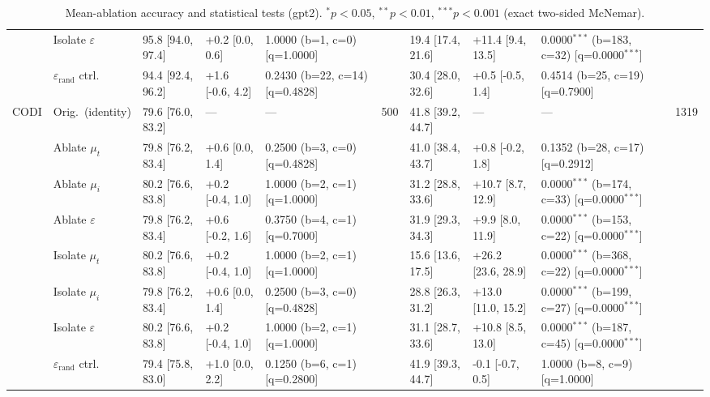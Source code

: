 \begin{table}[h!]
\begin{tabular}{ll lllc lllc}
 & Isolate $\varepsilon$ & 95.8 [94.0, 97.4] & +0.2 [0.0, 0.6] & 1.0000 (b=1, c=0) [q=1.0000] &  & 19.4 [17.4, 21.6] & +11.4 [9.4, 13.5] & 0.0000$^{***}$ (b=183, c=32) [q=0.0000$^{***}$] &  \\
 & $\varepsilon_\mathrm{rand}$ ctrl. & 94.4 [92.4, 96.2] & +1.6 [-0.6, 4.2] & 0.2430 (b=22, c=14) [q=0.4828] &  & 30.4 [28.0, 32.6] & +0.5 [-0.5, 1.4] & 0.4514 (b=25, c=19) [q=0.7900] &  \\
\cmidrule(lr){2-10}
\multirow{8}{*}{CODI} & Orig.\ (identity) & 79.6 [76.0, 83.2] & --- & --- & 500 & 41.8 [39.2, 44.7] & --- & --- & 1319 \\
 & Ablate $\mu_t$ & 79.8 [76.2, 83.4] & +0.6 [0.0, 1.4] & 0.2500 (b=3, c=0) [q=0.4828] &  & 41.0 [38.4, 43.7] & +0.8 [-0.2, 1.8] & 0.1352 (b=28, c=17) [q=0.2912] &  \\
 & Ablate $\mu_i$ & 80.2 [76.6, 83.8] & +0.2 [-0.4, 1.0] & 1.0000 (b=2, c=1) [q=1.0000] &  & 31.2 [28.8, 33.6] & +10.7 [8.7, 12.9] & 0.0000$^{***}$ (b=174, c=33) [q=0.0000$^{***}$] &  \\
 & Ablate $\varepsilon$ & 79.8 [76.2, 83.4] & +0.6 [-0.2, 1.6] & 0.3750 (b=4, c=1) [q=0.7000] &  & 31.9 [29.3, 34.3] & +9.9 [8.0, 11.9] & 0.0000$^{***}$ (b=153, c=22) [q=0.0000$^{***}$] &  \\
 & Isolate $\mu_t$ & 80.2 [76.6, 83.8] & +0.2 [-0.4, 1.0] & 1.0000 (b=2, c=1) [q=1.0000] &  & 15.6 [13.6, 17.5] & +26.2 [23.6, 28.9] & 0.0000$^{***}$ (b=368, c=22) [q=0.0000$^{***}$] &  \\
 & Isolate $\mu_i$ & 79.8 [76.2, 83.4] & +0.6 [0.0, 1.4] & 0.2500 (b=3, c=0) [q=0.4828] &  & 28.8 [26.3, 31.2] & +13.0 [11.0, 15.2] & 0.0000$^{***}$ (b=199, c=27) [q=0.0000$^{***}$] &  \\
 & Isolate $\varepsilon$ & 80.2 [76.6, 83.8] & +0.2 [-0.4, 1.0] & 1.0000 (b=2, c=1) [q=1.0000] &  & 31.1 [28.7, 33.6] & +10.8 [8.5, 13.0] & 0.0000$^{***}$ (b=187, c=45) [q=0.0000$^{***}$] &  \\
 & $\varepsilon_\mathrm{rand}$ ctrl. & 79.4 [75.8, 83.0] & +1.0 [0.0, 2.2] & 0.1250 (b=6, c=1) [q=0.2800] &  & 41.9 [39.3, 44.7] & -0.1 [-0.7, 0.5] & 1.0000 (b=8, c=9) [q=1.0000] &  \\
\bottomrule
\end{tabular}
\caption{Mean-ablation accuracy and statistical tests (gpt2). $^{*}p{<}0.05$, $^{**}p{<}0.01$, $^{***}p{<}0.001$ (exact two-sided McNemar).}
\label{tab:mean_ablation_stats_gpt2}
\end{table}